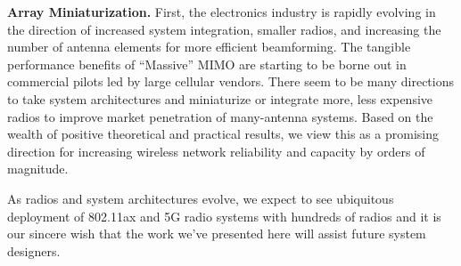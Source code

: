\textbf{Array Miniaturization.}
	First, the electronics industry is rapidly evolving in the direction of increased system integration, smaller radios, and increasing the number of antenna elements for more efficient beamforming.
	The tangible performance benefits of ``Massive'' MIMO are starting to be borne out in commercial pilots led by large cellular vendors.
	There seem to be many directions to take system architectures and miniaturize or integrate more, less expensive radios to improve market penetration of many-antenna systems.
	Based on the wealth of positive theoretical and practical results, we view this as a promising direction for increasing wireless network reliability and capacity by orders of magnitude.
	
	As radios and system architectures evolve, we expect to see ubiquitous deployment of 802.11ax and 5G radio systems with hundreds of radios and it is our sincere wish that the work we've presented here will assist future system designers.